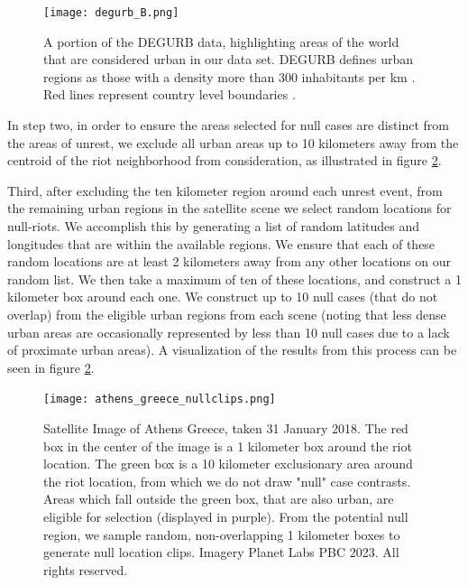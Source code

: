 \begin{figure}
    \centering
    \texttt{[image: degurb\_B.png]}
    \caption{A portion of the DEGURB data, highlighting areas of the world that are considered urban in our data set. DEGURB defines urban regions as those with a density more than 300 inhabitants per km \cite{urbanisation_manual_2021}.  Red lines represent country level boundaries \citep{runfola2020geoboundaries}.  }
    \label{fig:degurb}
\end{figure}


In step two, in order to ensure the areas selected for null cases are distinct from the areas of unrest, we exclude all urban areas up to 10 kilometers away from the centroid of the riot neighborhood from consideration, as illustrated in figure \ref{fig:athens_nullclips}.




Third, after excluding the ten kilometer region around each unrest event, from the remaining urban regions in the satellite scene we select random locations for null-riots.  We accomplish this by generating a list of random latitudes and longitudes that are within the available regions.  We ensure that each of these random locations are at least 2 kilometers away from any other locations on our random list.  We then take a maximum of ten of these locations, and construct a 1 kilometer box around each one.  We construct up to 10 null cases (that do not overlap) from the eligible urban regions from each scene (noting that less dense urban areas are occasionally represented by less than 10 null cases due to a lack of proximate urban areas). A visualization of the results from this process can be seen in figure \ref{fig:athens_nullclips}.

  

\begin{figure}
    \centering
    \texttt{[image: athens\_greece\_nullclips.png]}
    \caption{Satellite Image of Athens Greece, taken 31 January 2018.  The red box in the center of the image is a 1 kilometer box around the riot location.  The green box is a 10 kilometer exclusionary area around the riot location, from which we do not draw "null" case contrasts.  Areas which fall outside the green box, that are also urban, are eligible for selection (displayed  in purple).  From the potential null region, we sample random, non-overlapping 1 kilometer boxes to generate null location clips. Imagery \textcopyright Planet Labs PBC 2023. All rights reserved.}
    \label{fig:athens_nullclips}
\end{figure}



